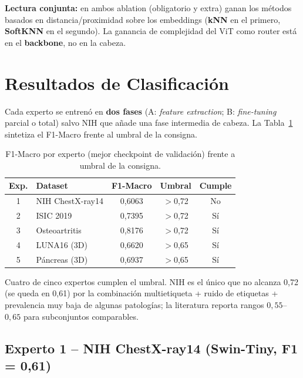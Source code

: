 \documentclass[conference]{IEEEtran}
\begin{document}
\textbf{Lectura conjunta:} en ambos ablation (obligatorio y extra) ganan los métodos basados en distancia/proximidad sobre los embeddings (\textbf{k\textendash NN} en el primero, \textbf{SoftKNN} en el segundo). La ganancia de complejidad del ViT como router está en el \textbf{backbone}, no en la cabeza.

\section{Resultados de Clasificación}

Cada experto se entrenó en \textbf{dos fases} (A: \textit{feature extraction}; B: \textit{fine-tuning} parcial o total) salvo NIH que añade una fase intermedia de cabeza. La Tabla~\ref{tab:f1_expertos} sintetiza el F1-Macro frente al umbral de la consigna.

\begin{table}[H]
\centering
\caption{F1-Macro por experto (mejor checkpoint de validación) frente a umbral de la consigna.}
\label{tab:f1_expertos}
\begin{tabular}{@{}clccc@{}}
\toprule
\textbf{Exp.} & \textbf{Dataset} & \textbf{F1-Macro} & \textbf{Umbral} & \textbf{Cumple} \\ \midrule
1 & NIH ChestX-ray14 & 0,6063 & $>$0,72 & No \\
2 & ISIC 2019        & 0,7395 & $>$0,72 & Sí \\
3 & Osteoartritis    & 0,8176 & $>$0,72 & Sí \\
4 & LUNA16 (3D)      & 0,6620 & $>$0,65 & Sí \\
5 & Páncreas (3D)    & 0,6937 & $>$0,65 & Sí \\ \bottomrule
\end{tabular}
\end{table}

Cuatro de cinco expertos cumplen el umbral. NIH es el único que no alcanza 0,72 (se queda en 0,61) por la combinación multietiqueta + ruido de etiquetas + prevalencia muy baja de algunas patologías; la literatura reporta rangos $0{,}55$--$0{,}65$ para subconjuntos comparables.

\subsection{Experto 1 -- NIH ChestX-ray14 (Swin-Tiny, F1 = 0,61)}
\end{document}

